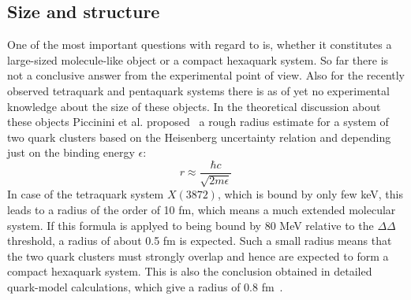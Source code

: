 %
\subsection{Size and structure}

One of the most important questions with regard to \dst is, whether it constitutes a large-sized
molecule-like object or a compact hexaquark system.
So far there is not a conclusive answer from the experimental point of view.
Also for the recently observed tetraquark and pentaquark systems there is as of yet no experimental
knowledge about the size of these objects.
In the theoretical discussion about these objects Piccinini et al. proposed~\cite{picci} a rough radius 
estimate for a system of two quark clusters based on the Heisenberg uncertainty relation and depending
just on the binding energy $\epsilon$:
\begin{equation}
    r \approx \frac{\hbar c}{\sqrt{2 m \epsilon}}
\end{equation}
In case of the tetraquark system $X(3872)$, which is bound by only few keV, this leads to a radius of 
the order of 10 fm, which means a much extended molecular system. 
If this formula is applyed to \dst being bound by 80 MeV relative to the $\Delta\Delta$ threshold, a radius of about 0.5 fm is expected.
Such a small radius means that the two quark clusters must strongly overlap and hence are expected
to form a compact hexaquark system.
This is also the conclusion obtained in detailed quark-model calculations, which give a radius of
0.8 fm~\cite{size1,size2}.